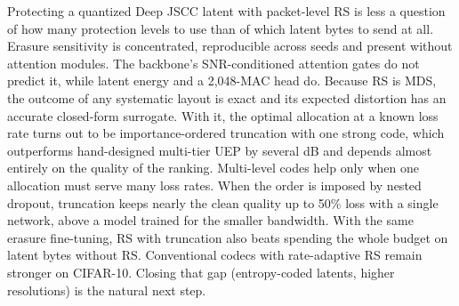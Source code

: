 Protecting a quantized Deep JSCC latent with packet-level RS is less a question of how many protection
levels to use than of which latent bytes to send at all. Erasure sensitivity is concentrated, reproducible
across seeds and present without attention modules. The backbone's SNR-conditioned attention gates do not
predict it, while latent energy and a 2,048-MAC head do. Because RS is MDS, the outcome of any systematic
layout is exact and its expected distortion has an accurate closed-form surrogate. With it, the optimal
allocation at a known loss rate turns out to be importance-ordered truncation with one strong code, which
outperforms hand-designed multi-tier UEP by several dB and depends almost entirely on the quality of the
ranking. Multi-level codes help only when one allocation must serve many loss rates. When the order is
imposed by nested dropout, truncation keeps nearly the clean quality up to 50\% loss with a single network,
above a model trained for the smaller bandwidth. With the same erasure fine-tuning, RS with truncation also beats
spending the whole budget on latent bytes without RS. Conventional codecs with rate-adaptive RS remain stronger on
CIFAR-10. Closing that gap (entropy-coded latents, higher resolutions) is the natural next step.

